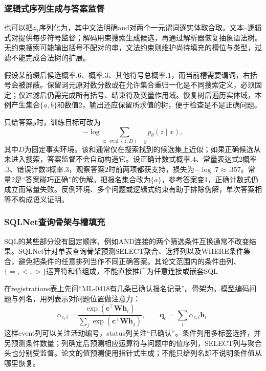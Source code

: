 \subsubsection{逻辑式序列生成与答案监督}
\label{sec:nlp-analysis-logic-generation}

也可以把$z_1$序列化为，其中文法明确and对两个一元谓词逐实体取合取。文本--逻辑式对提供每步符号监督；解码用束搜索生成候选，再通过解析器恢复抽象语法树。无约束搜索可能输出括号不配对的串，文法约束则维护尚待填充的槽位与类型，过滤不能完成合法树的扩展。

假设某前缀后候选概率$.6$、\code{)}概率$.3$、其他符号总概率$.1$，而当前槽需要谓词，右括号会被屏蔽。保留词元原对数分数或在允许集合重归一化是不同搜索定义，必须固定；仅过滤后仍需完成所有括号、结束符及变量作用域。恢复树后遍历实体域，本例产生集合$\{a,b\}$和数值2，输出还应保留所求值的树，便于检查是不是正确问题。

只给答案$y$时，训练目标可改为
\[
 -\log\sum_{z:\,\operatorname{eval}(z,D)=y}p_\theta(z\mid x),
\]
其中$D$为固定事实环境。该和通常仅在搜索找到的候选集上近似；如果正确候选从未进入搜索，答案监督不会自动构造它。设正确计数式概率$.4$、常量表达式2概率$.3$、错误计数3概率$.3$，观察答案2时前两项都获支持，损失为$-\log .7\approx.357$。常量2是“答案碰巧正确”的伪解。把报名集合改为$\{a\}$，参考答案变1，正确计数式仍成立而常量失败。反例环境、多个问题或逻辑式约束有助于排除伪解，单次答案相等不构成语义证明。

\subsubsection{SQLNet查询骨架与槽填充}
\label{sec:nlp-analysis-sqlnet}

SQL的某些部分没有固定顺序，例如AND连接的两个筛选条件互换通常不改变结果。SQLNet针对单表查询骨架预测SELECT聚合、选择列以及WHERE条件集合，避免把条件的任意排列当作不同正确答案。其论文范围内的条件由列、$\{=,<,>\}$运算符和值组成，不能直接推广为任意连接或嵌套SQL

在registrations表上先问“ML-0418有几条已确认报名记录”。骨架为。模型编码问题与列名，用列表示对问题位置做注意力：
\[
 \alpha_{c,i}=
 \frac{\exp(\bm c^\top\bm W\bm h_i)}
      {\sum_j\exp(\bm c^\top\bm W\bm h_j)},\qquad
 \bm q_c=\sum_i\alpha_{c,i}\bm h_i.
\]
这样event列可以关注活动编号，status列关注“已确认”。条件列用多标签选择，并另预测条件数量；列确定后预测相应运算符与问题中的值序列，SELECT列与聚合头也分别受监督。论文的值预测使用指针式生成；不能只给列名却不说明条件值从哪里恢复。

